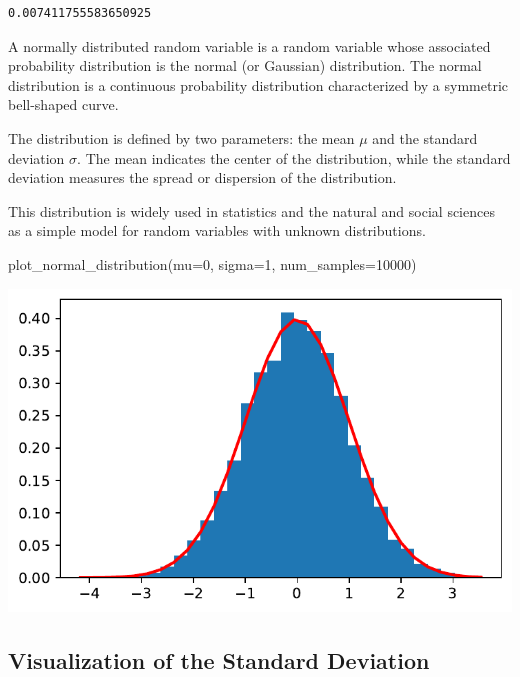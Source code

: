 \documentclass[
  letterpaper,
  DIV=11,
  numbers=noendperiod]{scrreprt}
\newenvironment{Shaded}{\begin{snugshade}}{\end{snugshade}}
\newcommand{\DecValTok}[1]{\textcolor[rgb]{0.68,0.00,0.00}{#1}}
\newcommand{\NormalTok}[1]{\textcolor[rgb]{0.00,0.23,0.31}{#1}}
\newcommand{\OperatorTok}[1]{\textcolor[rgb]{0.37,0.37,0.37}{#1}}
\begin{document}
\begin{verbatim}
0.007411755583650925
\end{verbatim}

A normally distributed random variable is a random variable whose
associated probability distribution is the normal (or Gaussian)
distribution. The normal distribution is a continuous probability
distribution characterized by a symmetric bell-shaped curve.

The distribution is defined by two parameters: the mean \(\mu\) and the
standard deviation \(\sigma\). The mean indicates the center of the
distribution, while the standard deviation measures the spread or
dispersion of the distribution.

This distribution is widely used in statistics and the natural and
social sciences as a simple model for random variables with unknown
distributions.

\begin{Shaded}
\begin{Highlighting}[]
\NormalTok{plot\_normal\_distribution(mu}\OperatorTok{=}\DecValTok{0}\NormalTok{, sigma}\OperatorTok{=}\DecValTok{1}\NormalTok{, num\_samples}\OperatorTok{=}\DecValTok{10000}\NormalTok{)}
\end{Highlighting}
\end{Shaded}

\includegraphics{006_num_gp_files/figure-pdf/cell-20-output-1.pdf}

\subsection{Visualization of the Standard
Deviation}\label{visualization-of-the-standard-deviation}
\end{document}
